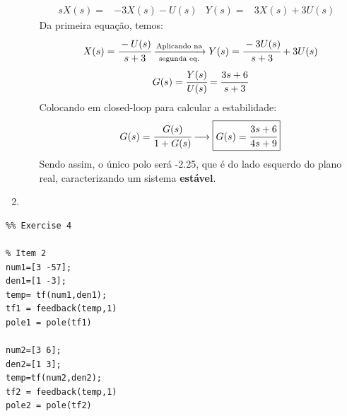 \documentclass[a4paper,11pt]{article}
\begin{document}
\begin{enumerate}
\begin{enumerate}
		\begin{align*}
		sX(s)=&-3X(s)-U(s)&Y(s)=&3X(s)+3U(s)&
		\end{align*}
		Da primeira equação, temos:\\
		$$ X(s)=\cfrac{-U(s)}{s+3}\xrightarrow[\text{segunda eq.}]{\text{Aplicando na}}Y(s)=\cfrac{-3U(s)}{s+3}+3U(s) $$
		\vskip0.1cm
		$$G(s)=\cfrac{Y(s)}{U(s)}=\cfrac{3s+6}{s+3}$$
		\vskip0.1cm
		Colocando em closed-loop para calcular a estabilidade:
		\vskip0.1cm
		$$ G(s)=\cfrac{G(s)}{1+G(s)}\longrightarrow \boxed{G(s)=\cfrac{3s+6}{4s+9}} $$
		\vskip0.1cm
		Sendo assim, o único polo será -2.25, que é do lado esquerdo do plano real, caracterizando um sistema \textbf{estável}.
	\end{enumerate}
	
	\item
\end{enumerate}
\newpage
\begin{lstlisting}
%% Exercise 4

% Item 2
num1=[3 -57];
den1=[1 -3];
temp= tf(num1,den1);
tf1 = feedback(temp,1)
pole1 = pole(tf1)

num2=[3 6];
den2=[1 3];
temp=tf(num2,den2);
tf2 = feedback(temp,1)
pole2 = pole(tf2)

\end{lstlisting}
\end{document}
